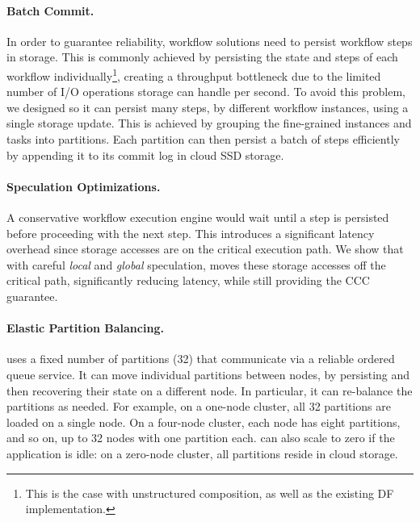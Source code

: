 \paragraph{Batch Commit.}

In order to guarantee reliability, workflow solutions need to persist workflow steps in storage. This is commonly achieved by persisting the state and steps of each workflow individually\footnote{This is the case with unstructured composition, as well as the existing DF implementation.}, creating a throughput bottleneck due to the limited number of I/O operations storage can handle per second.
To avoid this problem, we designed \emph{\sys} so it can persist many steps, by different workflow instances, using a single storage update. This is achieved by grouping the fine-grained instances and tasks into partitions. Each partition can then persist a batch of steps efficiently by appending it to its commit log in cloud SSD storage.

\paragraph{Speculation Optimizations. } 

A conservative workflow execution engine would wait until a step is persisted before proceeding with the next step. This introduces a significant latency overhead since storage accesses are on the critical execution path. We show that with careful \emph{local} and \emph{global} speculation, \sys moves these storage accesses off the critical path, significantly reducing latency, while still providing the CCC guarantee.\str


\paragraph{Elastic Partition Balancing.} 

\sys uses a fixed number of partitions (32) that communicate via a reliable ordered queue service. It can move individual partitions between nodes, by persisting and then recovering their state on a different node. In particular, it can re-balance the partitions as needed. For example, on a one-node cluster, all 32 partitions are loaded on a single node. On a four-node cluster, each node has eight partitions, and so on, up to 32 nodes with one partition each. \sys can also scale to zero if the application is idle: on a zero-node cluster, all partitions reside in cloud storage.

